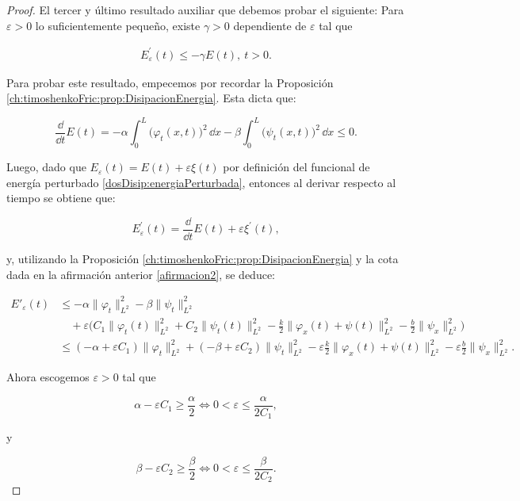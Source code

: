 \begin{proof}
    El tercer y último resultado auxiliar que debemos probar el siguiente: Para $\varepsilon > 0$ lo suficientemente pequeño, existe $\gamma > 0$ dependiente de $\varepsilon$ tal que

    \begin{align}
        \label{afirmacion3}
        E_\varepsilon^\prime(t) \leq -\gamma E(t), \ t > 0.
    \end{align}

    Para probar este resultado, empecemos por recordar la Proposición \ref{ch:timoshenkoFric:prop:DisipacionEnergia}. Esta dicta que:

    \[\frac{\dd}{\dd t}E(t) = -\alpha\int_0^L \big(\varphi_t(x, t)\big)^2 \, \dd x -\beta\int_0^L \big(\psi_t(x, t)\big)^2 \, \dd x \leq 0.\]

    Luego, dado que $E_\varepsilon(t) = E(t) + \varepsilon\xi(t)$ por definición del funcional de energía perturbado \eqref{dosDisip:energiaPerturbada}, entonces al derivar respecto al tiempo se obtiene que:

    \[E^\prime_\varepsilon(t) = \frac{\dd}{\dd t}E(t) + \varepsilon\xi^\prime(t),\]

    y, utilizando la Proposición \ref{ch:timoshenkoFric:prop:DisipacionEnergia} y la cota dada en la afirmación anterior \eqref{afirmacion2}, se deduce:

    \begin{align*}
        E'_\varepsilon(t) &\leq -\alpha \lVert \varphi_t \rVert^2_{L^2} -\beta \lVert \psi_t \rVert^2_{L^2} \\
        &\quad + \varepsilon \Biggl(C_1 \lVert \varphi_t(t) \rVert^2_{L^2} + C_2 \lVert \psi_t(t) \rVert^2_{L^2} - \frac{k}{2} \lVert \varphi_x(t) + \psi(t) \rVert^2_{L^2} - \frac{b}{2} \lVert \psi_x \rVert^2_{L^2} \Biggr) \\
        &\leq (-\alpha + \varepsilon C_1)\lVert \varphi_t \rVert^2_{L^2} + ( -\beta + \varepsilon C_2)\lVert \psi_t \rVert^2_{L^2} - \varepsilon \frac{k}{2} \lVert \varphi_x(t) + \psi(t) \rVert^2_{L^2} - \varepsilon \frac{b}{2} \lVert \psi_x \rVert^2_{L^2}.
    \end{align*}

    Ahora escogemos $\varepsilon > 0$ tal que

    \[\alpha - \varepsilon C_1 \geq \frac{\alpha}{2} \iff 0< \varepsilon \leq \frac{\alpha}{2C_1},\]

    y

    \[\beta - \varepsilon C_2 \geq \frac{\beta}{2} \iff 0< \varepsilon \leq \frac{\beta}{2C_2}.\]


\end{proof}
